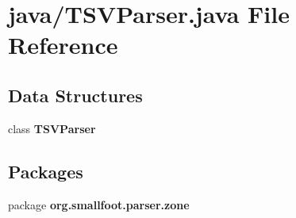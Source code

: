 \section{java/\+T\+S\+V\+Parser.java File Reference}
\label{TSVParser_8java}
\subsection*{Data Structures}
\begin{DoxyCompactItemize}
\item 
class {\bf T\+S\+V\+Parser}
\end{DoxyCompactItemize}
\subsection*{Packages}
\begin{DoxyCompactItemize}
\item 
package {\bf org.\+smallfoot.\+parser.\+zone}
\end{DoxyCompactItemize}
